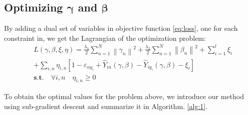 \subsection{Optimizing $\boldsymbol{\gamma}$ and $\boldsymbol{\beta}$}
By adding a dual set of variables in objective function \eqref{eq:loss}, one for each constraint in, we get the Lagrangian of the optimization problem:
\begin{equation}\label{eq:dual}
\begin{aligned}
 &L\left( {\gamma ,\beta ,\xi ,\eta } \right) =
 \frac{{{\lambda _1}}}{2}\sum\limits_{n = 1}^N {{{\left\| {{\gamma _n}} \right\|}^2}}  + \frac{{{\lambda _2}}}{2}\sum\limits_{n = 1}^N {{{\left\| {{\beta _n}} \right\|}^2}}  + \sum\limits_{i = 1}^l {{\xi _i}} \\
   &+ \sum\limits_{i,n} {{\eta _{i,n}}\left[ {1 - {\varepsilon _{n{y_i}}} + {{\hat Y}_{in}}\left( {\gamma ,\beta } \right) - {{\hat Y}_{i{y_i}}}\left( {\gamma ,\beta } \right) - {\xi _i}} \right]}  \\
 &\textbf{s.t.} \quad  \forall i,n \quad {} {\eta _{i,n}} \ge 0
\end{aligned}
\end{equation}

To obtain the optimal values for the problem above, we introduce our method using sub-gradient descent \cite{BoydCO} and summarize it in Algorithm. \ref{alg:1}. 

